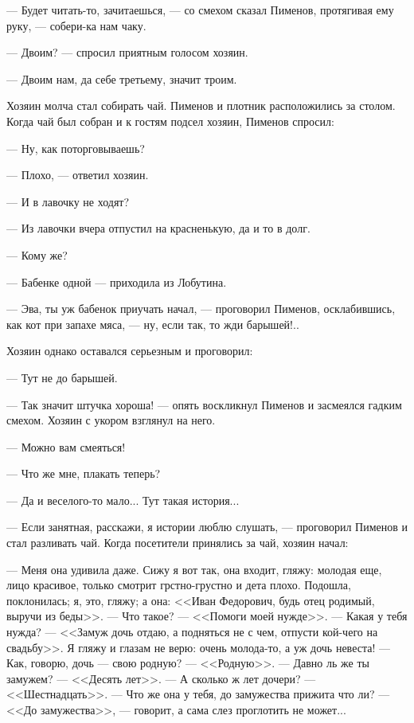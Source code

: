 --- Будет читать-то, зачитаешься, --- со смехом сказал Пименов, протягивая ему руку, --- собери-ка нам чаку.

--- Двоим? --- спросил приятным голосом хозяин.

--- Двоим нам, да себе третьему, значит троим.

Хозяин молча стал собирать чай. Пименов и плотник расположились за столом. Когда чай был собран и к гостям подсел хозяин, Пименов спросил:

--- Ну, как поторговываешь?

--- Плохо, --- ответил хозяин.

--- И в лавочку не ходят?

--- Из лавочки вчера отпустил на красненькую, да и то в долг.

--- Кому же?

--- Бабенке одной --- приходила из Лобутина.

--- Эва, ты уж бабенок приучать начал, --- проговорил Пименов, осклабившись, как кот при запахе мяса, --- ну, если так, то жди барышей!..

Хозяин однако оставался серьезным и проговорил:

--- Тут не до барышей.

--- Так значит штучка хороша! --- опять воскликнул Пименов и засмеялся гадким смехом. Хозяин с укором взглянул на него.

--- Можно вам смеяться!

--- Что же мне, плакать теперь?

--- Да и веселого-то мало... Тут такая история...

--- Если занятная, расскажи, я истории люблю слушать, --- проговорил Пименов и стал разливать чай. Когда посетители принялись за чай, хозяин начал:

--- Меня она удивила даже. Сижу я вот так, она входит, гляжу: молодая еще, лицо красивое, только смотрит грстно-грустно и дета плохо. Подошла, поклонилась; я, это, гляжу; а она: <<Иван Федорович, будь отец родимый, выручи из беды>>. --- Что такое? --- <<Помоги моей нужде>>. --- Какая у тебя нужда? --- <<Замуж дочь отдаю, а подняться не с чем, отпусти кой-чего на свадьбу>>. Я гляжу и глазам не верю: очень молода-то, а уж дочь невеста! --- Как, говорю, дочь --- свою родную? --- <<Родную>>. --- Давно ль же ты замужем? --- <<Десять лет>>. --- А сколько ж лет дочери? --- <<Шестнадцать>>. --- Что же она у тебя, до замужества прижита что ли? --- <<До замужества>>, --- говорит, а сама слез проглотить не может...

